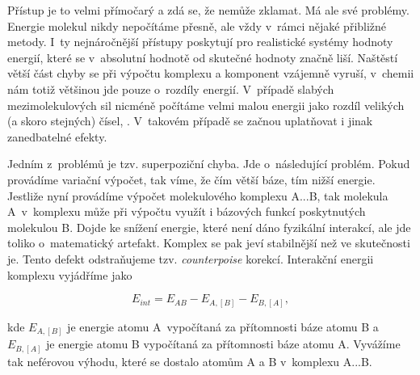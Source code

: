 Přístup je to velmi přímočarý a zdá se, že nemůže zklamat. Má ale své problémy. Energie molekul nikdy nepočítáme přesně, ale vždy v~rámci nějaké přibližné metody. I~ty nejnáročnější přístupy poskytují pro realistické systémy hodnoty energií, které se v~absolutní hodnotě od skutečné hodnoty značně liší. Naštěstí větší část chyby se při výpočtu komplexu a komponent vzájemně vyruší, v~chemii nám totiž většinou jde pouze o~rozdíly energií. V~případě slabých mezimolekulových sil nicméně počítáme velmi malou energii jako rozdíl velikých (a skoro stejných) čísel, . V~takovém případě se začnou uplatňovat i jinak zanedbatelné efekty.

Jedním z~problémů je tzv. superpoziční chyba. Jde o~následující problém. Pokud provádíme variační výpočet, tak  víme, že čím větší báze, tím nižší energie. Jestliže nyní provádíme výpočet molekulového komplexu A...B, tak molekula A~v~komplexu může při výpočtu využít i bázových funkcí poskytnutých molekulou B. Dojde ke snížení energie, které není dáno fyzikální interakcí, ale jde toliko o~matematický artefakt. Komplex se pak jeví stabilnější než ve skutečnosti je. Tento defekt odstraňujeme tzv. \textit{counterpoise} korekcí. Interakční energii komplexu vyjádříme jako 

\begin{equation}
E_{int} = E_{AB} - E_{A,[B]} - E_{B,[A]},
\label{rov:MS-13}
\end{equation}

\noindent kde $E_{A,{[B]}}$ je energie atomu A~vypočítaná za přítomnosti báze atomu B a $E_{B,{[A]}}$ je energie atomu B vypočítaná za přítomnosti báze atomu A. Vyvážíme tak neférovou výhodu, které se dostalo atomům A a B v~komplexu A...B.
